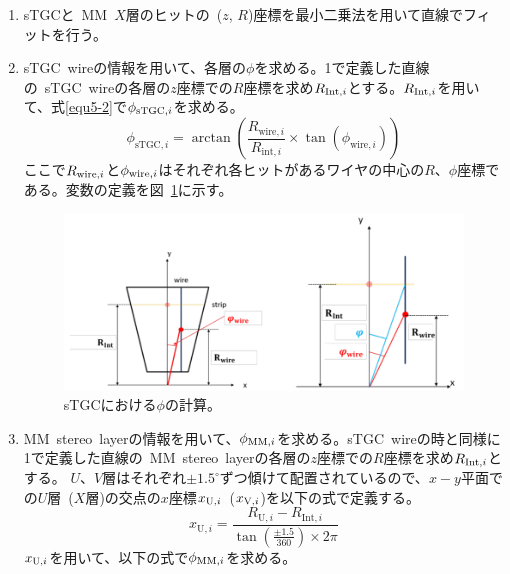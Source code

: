 \begin{enumerate}
    \item sTGCと~MM~$X$層のヒットの~($z$, $R$)座標を最小二乗法を用いて直線でフィットを行う。
    \item sTGC~wireの情報を用いて、各層の$\phi$を求める。1で定義した直線の~sTGC~wireの各層の$z$座標での$R$座標を求め$R_{{\rm{Int}},i}$とする。$R_{{\rm{Int}},i}$を用いて、式\eqref{equ5-2}で$\phi_{{\rm{sTGC}},i}$を求める。
    \begin{equation}
        \phi_{\mathrm{sTGC},i}=\arctan\left(\frac{R_{\mathrm{wire},i}}{R_{\mathrm{int},i}} \times \tan(\phi_{\mathrm{wire},i})\right)\label{equ5-2}
    \end{equation}
    ここで$R_{{\rm{wire}},i}$と$\phi_{{\rm{wire}},i}$はそれぞれ各ヒットがあるワイヤの中心の$R$、$\phi$座標である。変数の定義を図~\ref{fig:5-2}に示す。
    
    \begin{figure}[H]
        \centering
        \includegraphics[clip, width=12cm]{fig/5/sTGC_phi.png}
        \caption{sTGCにおける$\phi$の計算\cite{article:noguchi}。}
        \label{fig:5-2}
    \end{figure}
        
    \item MM~stereo~layerの情報を用いて、$\phi_{{\rm{MM}},i}$を求める。sTGC~wireの時と同様に1で定義した直線の~MM~stereo~layerの各層の$z$座標での$R$座標を求め$R_{{\rm{Int}},i}$とする。
    $U$、$V$層はそれぞれ$\pm1.5^{\circ}$ずつ傾けて配置されているので、$x-y$平面での$U$層~($X$層)の交点の$x$座標$x_{{\rm{U}},i}$~($x_{{\rm{V}},i}$)を以下の式で定義する。
    \begin{equation}
        x_{\mathrm{U},i}=\frac{R_{\mathrm{U},i}-R_{\mathrm{Int},i}}{\tan(\frac{\pm1.5}{360}) \times 2\pi}\label{equ5-3}
    \end{equation}
    $x_{{\rm{U}},i}$を用いて、以下の式で$\phi_{{\rm{MM}},i}$を求める。
    

\end{enumerate}
